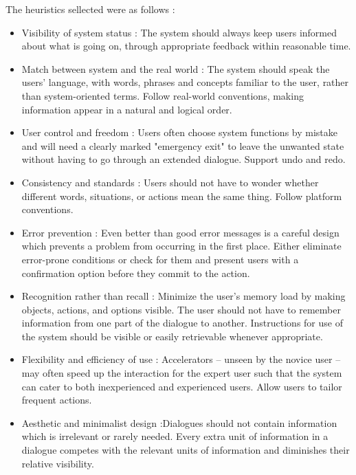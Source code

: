 \documentclass{article}
\begin{document}
The heuristics sellected were as follows : 
\begin{itemize}
\item Visibility of system status : The system should always keep users informed about what is going on, through appropriate feedback within reasonable time. 

\item Match between system and the real world : The system should speak the users' language, with words, phrases and concepts familiar to the user, rather than system-oriented terms. Follow real-world conventions, making information appear in a natural and logical order.
 
\item User control and freedom : Users often choose system functions by mistake and will need a clearly marked "emergency exit" to leave the unwanted state without having to go through an extended dialogue. Support undo and redo. 

\item Consistency and standards : Users should not have to wonder whether different words, situations, or actions mean the same thing. Follow platform conventions. 

\item Error prevention : Even better than good error messages is a careful design which prevents a problem from occurring in the first place. Either eliminate error-prone conditions or check for them and present users with a confirmation option before they commit to the action. 

\item Recognition rather than recall : Minimize the user's memory load by making objects, actions, and options visible. The user should not have to remember information from one part of the dialogue to another. Instructions for use of the system should be visible or easily retrievable whenever appropriate. 

\item Flexibility and efficiency of use : Accelerators -- unseen by the novice user -- may often speed up the interaction for the expert user such that the system can cater to both inexperienced and experienced users. Allow users to tailor frequent actions. 
    
\item Aesthetic and minimalist design :Dialogues should not contain information which is irrelevant or rarely needed. Every extra unit of information in a dialogue competes with the relevant units of information and diminishes their relative visibility. 
    

\end{itemize}
\end{document}
